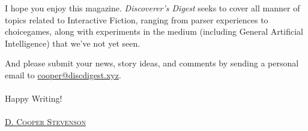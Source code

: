I hope you enjoy this magazine. \emph{Discoverer's Digest } seeks to cover all manner of
topics related to Interactive Fiction, ranging from parser experiences to
choice\textemdash games, along with experiments in the medium (including General Artificial Intelligence) that we've not yet seen.

And please submit your news, story ideas, and comments by sending a personal email to \href{mailto:cooper@discdigest.xyz}{cooper@discdigest.xyz}. \\ \\

\noindent Happy Writing! \\ \\

\noindent \href{mailto:cooper@discdigest.xyz}{\textsc{D. Cooper Stevenson}}

